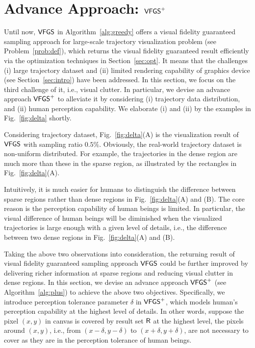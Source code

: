 \section{Advance Approach: $\mathsf{VFGS}^{+}$}\label{sec:aa}
Until now, $\mathsf{VFGS}$ in Algorithm~\ref{alg:greedy} offers a visual fidelity guaranteed sampling approach for large-scale trajectory visualization problem (see Problem~\ref{prob:def}),
which returns the visual fidelity guaranteed result efficiently via the optimization techniques in Section~\ref{sec:opt}.
It means that the challenges (i) large trajectory dataset and (ii) limited rendering capability of graphics device (see Section~\ref{sec:intro}) have been addressed.
In this section, we focus on the third challenge of it, i.e.,  visual clutter.
In particular, we devise an advance approach $\mathsf{VFGS}^{+}$ to alleviate it by considering
(i) trajectory data distribution, and (ii) human perception capability.
We elaborate (i) and (ii) by the examples in Fig.~\ref{fig:delta} shortly.

 Considering \pt{} trajectory dataset, Fig.~\ref{fig:delta}(A) is the visualization result of $\mathsf{VFGS}$ with sampling ratio $0.5\%$.
Obviously, the real-world trajectory dataset is non-uniform distributed.
For example, the trajectories in the dense region are much more than these in the sparse region, as illustrated by the rectangles in Fig.~\ref{fig:delta}(A).

 Intuitively, it is much easier for humans to distinguish the difference between sparse regions rather than dense regions in Fig.~\ref{fig:delta}(A) and (B).
The core reason is the perception capability of human beings is limited.
In particular, the visual difference of human beings will be diminished when the visualized trajectories is large enough with a given level of details,
i.e., the difference between two dense regions in Fig.~\ref{fig:delta}(A) and (B).

Taking the above two observations into consideration, the returning result of visual fidelity guaranteed sampling approach $\mathsf{VFGS}$ could be further improved by
delivering richer information at sparse regions and reducing visual clutter in dense regions.
In this section, we devise an advance approach $\mathsf{VFGS}^{+}$ (see Algorithm~\ref{alg:plus}) to achieve the above two objectives.
Specifically, we introduce perception tolerance parameter $\delta$ in $\mathsf{VFGS}^{+}$, which models human's perception capability at the highest level of details.
In other words, suppose the pixel $(x,y)$ in canvas is covered by result set $\mathsf{R}$ at the highest level,
the pixels around $(x,y)$, i.e., from $(x-\delta, y-\delta)$ to $(x+\delta, y+\delta)$, are not necessary to cover as they are in the perception tolerance of human beings.


